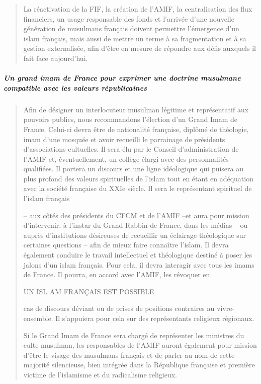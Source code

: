 \begin{quote}
La réactivation de la FIF, la création de l'AMIF, la centralisation des
flux financiers, un usage responsable des fonds et l'arrivée d'une
nouvelle génération de musulmans français doivent permettre l'émergence
d'un islam français, mais aussi de mettre un terme à sa fragmentation et
à sa gestion externalisée, afin d'être en mesure de répondre aux défis
auxquels il fait face aujourd'hui.
\end{quote}

\hypertarget{un-grand-imam-de-france-pour-exprimer-une-doctrine-musulmane-compatible-avec-les-valeurs-ruxe9publicaines}{%
\subparagraph{Un grand imam de France pour exprimer une doctrine
musulmane compatible avec les valeurs
républicaines}\label{un-grand-imam-de-france-pour-exprimer-une-doctrine-musulmane-compatible-avec-les-valeurs-ruxe9publicaines}}

\begin{quote}
Afin de désigner un interlocuteur musulman légitime et représentatif aux
pouvoirs publics, nous recommandons l'élection d'un Grand Imam de
France. Celui-ci devra être de nationalité française, diplômé de
théologie, imam d'une mosquée et avoir recueilli le parrainage de
présidents d'associations cultuelles. Il sera élu par le Conseil
d'administration de l'AMIF et, éventuellement, un collège élargi avec
des personnalités qualifiées. Il portera un discours et une ligne
idéologique qui puisera au plus profond des valeurs spirituelles de
l'islam tout en étant en adéquation avec la société française du XXIe
siècle. Il sera le représentant spirituel de l'islam français

-- aux côtés des présidents du CFCM et de l'AMIF --et aura pour mission
d'intervenir, à l'instar du Grand Rabbin de France, dans les médias --
ou auprès d'institutions désireuses de recueillir un éclairage
théologique sur certaines questions -- afin de mieux faire connaître
l'islam. Il devra également conduire le travail intellectuel et
théologique destiné à poser les jalons d'un islam français. Pour cela,
il devra interagir avec tous les imams de France. Il pourra, en accord
avec l'AMIF, les révoquer en

UN ISL AM FRANÇAIS EST POSSIBLE

cas de discours déviant ou de prises de positions contraires au
vivre-ensemble. Il s'appuiera pour cela sur des représentants religieux
régionaux.

Si le Grand Imam de France sera chargé de représenter les ministres du
culte musulman, les responsables de l'AMIF auront également pour mission
d'être le visage des musulmans français et de parler au nom de cette
majorité silencieuse, bien intégrée dans la République française et
première victime de l'islamisme et du radicalisme religieux.
\end{quote}

